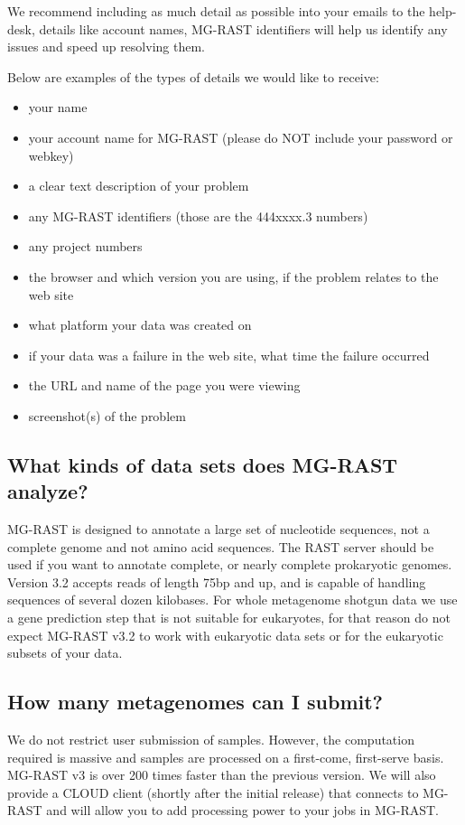 \documentclass[12pt,fullpage]{report}
\begin{document}
We recommend including as much detail as possible into your emails to the help-desk, details like account names, MG-RAST identifiers will help us identify any issues and speed up resolving them.

Below are examples of the types of details we would like to receive:
\begin{itemize}
\item your name
\item your account name for MG-RAST (please do NOT include your password or webkey)
\item a clear text description of your problem
\item any MG-RAST identifiers (those are the 444xxxx.3 numbers)
\item any project numbers
\item the browser and which version you are using, if the problem relates to the web site
\item what platform your data was created on
\item if your data was a failure in the web site, what time the failure occurred
\item the URL and name of the page you were viewing
\item screenshot(s) of the problem

\end{itemize}
\subsection*{What kinds of data sets does MG-RAST analyze?}
MG-RAST is designed to annotate a large set of nucleotide sequences, not a complete genome and not amino acid sequences. The RAST server should be used if you want to annotate complete, or nearly complete prokaryotic genomes. Version 3.2 accepts reads of length 75bp and up, and is capable of handling sequences of several dozen kilobases. For whole metagenome shotgun data we use a gene prediction step that is not suitable for eukaryotes, for that reason do not expect MG-RAST v3.2 to work with eukaryotic data sets or for the eukaryotic subsets of your data.
\subsection*{How many metagenomes can I submit?}
We do not restrict user submission of samples. However, the computation required is massive and samples are processed on a first-come, first-serve basis. MG-RAST v3 is over 200 times faster than the previous version. We will also provide a CLOUD client (shortly after the initial release) that connects to MG-RAST and will allow you to add processing power to your jobs in MG-RAST.
\end{document}
